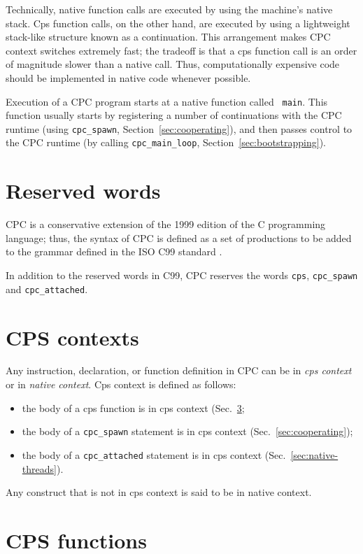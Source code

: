 \documentclass[a4paper]{report}
\begin{document}
Technically, native function calls are executed by using the machine's
native stack.  Cps function calls, on the other hand, are executed by
using a lightweight stack-like structure known as a continuation.
This arrangement makes CPC context switches extremely fast; the
tradeoff is that a cps function call is an order of magnitude slower
than a native call.  Thus, computationally expensive code should be
implemented in native code whenever possible.

Execution of a CPC program starts at a native function called {\tt
  main}.  This function usually starts by registering a number of
continuations with the CPC runtime (using {\tt cpc\_spawn},
Section~\ref{sec:cooperating}), and then passes control to the CPC
runtime (by calling {\tt cpc\_main\_loop}, Section~\ref{sec:bootstrapping}).

\section{Reserved words}

CPC is a conservative extension of the 1999 edition of the C programming
language; thus, the syntax of CPC is defined as a set of productions to be
added to the grammar defined in the ISO C99 standard \cite{iso:c99}.

In addition to the reserved words in C99, CPC reserves the words
{\tt cps}, {\tt cpc\_spawn} and {\tt cpc\_attached}.

\section{CPS contexts} \label{sec:contexts}

Any instruction, declaration, or function definition in CPC can be in
{\em cps context\/} or in {\em native context}.  Cps context is
defined as follows:
\begin{itemize}
\item the body of a cps function is in cps context
  (Sec.~\ref{sec:cpc-functions};
\item the body of a {\tt cpc\_spawn} statement is in cps context
  (Sec.~\ref{sec:cooperating});
\item the body of a {\tt cpc\_attached} statement is in cps context
  (Sec.~\ref{sec:native-threads}).
\end{itemize}
Any construct that is not in cps context is said to be in native context.

\section{CPS functions} \label{sec:cpc-functions}
\end{document}

